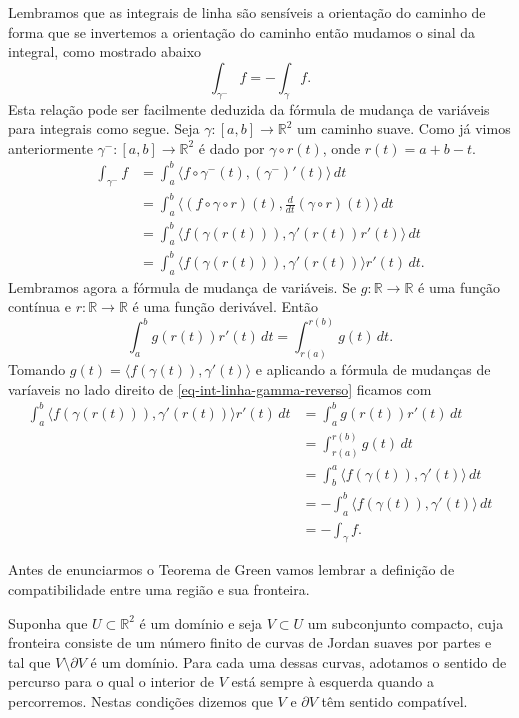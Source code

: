 Lembramos que as integrais de linha são sensíveis a orientação do caminho de forma
que se invertemos a orientação do caminho então mudamos o sinal da integral, como mostrado abaixo
\[
\int_{\gamma^{-}} f = -\int_{\gamma} f.
\]
Esta relação pode ser facilmente deduzida da fórmula de mudança de variáveis para integrais
como segue. Seja $\gamma:[a,b]\to\mathbb{R}^2$ um caminho suave. Como já vimos anteriormente
$\gamma^{-}:[a,b]\to\mathbb{R}^2$ é dado por $\gamma\circ r(t)$, onde $r(t)=a+b-t$.
\begin{align}\label{eq-int-linha-gamma-reverso}
\int_{\gamma^{-}}f
&=
\int_{a}^{b} \langle f\circ\gamma^{-}(t),(\gamma^{-})'(t) \rangle \, dt
\nonumber
\\
&=
\int_{a}^{b} \langle (f\circ\gamma\circ r)(t),\frac{d}{dt}(\gamma\circ r)(t) \rangle \, dt
\nonumber
\\
&=
\int_{a}^{b} \langle f(\gamma(r(t))),\gamma'(r(t))r'(t) \rangle \, dt
\nonumber
\\
&=
\int_{a}^{b} \langle f(\gamma(r(t))),\gamma'(r(t))\rangle r'(t)\, dt.
\end{align}
Lembramos agora a fórmula de mudança de variáveis. Se $g:\mathbb{R}\to\mathbb{R}$ é uma função
contínua e $r:\mathbb{R}\to\mathbb{R}$ é uma função derivável. Então 
\[
\int_{a}^{b} g(r(t))r'(t)\, dt = \int_{r(a)}^{r(b)} g(t)\, dt.
\]
Tomando $g(t)= \langle f(\gamma(t)),\gamma'(t)\rangle$ e aplicando a fórmula de mudanças
de varíaveis no lado direito de \eqref{eq-int-linha-gamma-reverso} ficamos com
\begin{align*}
\int_{a}^{b} \langle f(\gamma(r(t))),\gamma'(r(t))\rangle r'(t)\, dt
&=
\int_{a}^{b} g(r(t))r'(t)\, dt
\\[0.2cm]
&=
\int_{r(a)}^{r(b)} g(t)\, dt
\\[0.2cm]
&=
\int_{b}^{a} \langle f(\gamma(t)),\gamma'(t)\rangle\, dt
\\[0.2cm]
&=
-\int_{a}^{b} \langle f(\gamma(t)),\gamma'(t)\rangle\, dt
\\[0.2cm]
&=
-\int_{\gamma} f.
\end{align*}


Antes de enunciarmos o Teorema de Green vamos lembrar a definição de compatibilidade 
entre uma região e sua fronteira. 

\begin{definicao}
	Suponha que $U\subset \mathbb{R}^2$ é um domínio e seja 
	$V\subset U$ um subconjunto compacto, cuja fronteira consiste de um 
	número finito de curvas de Jordan suaves por partes e tal que 
	$V\setminus \partial V$ é um domínio. Para cada uma dessas curvas,
	adotamos  o sentido de percurso para o qual o interior de $V$ está sempre 
	à esquerda quando a percorremos. Nestas condições dizemos que $V$ 
	e $\partial V$ têm sentido compatível.
\end{definicao}

